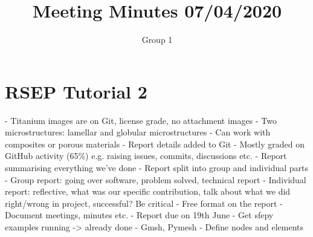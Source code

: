 \documentclass{article}
\title{\bf Meeting Minutes 07/04/2020}
\author{Group 1}
\begin{document}
\maketitle


\section{RSEP Tutorial 2}


- Titanium images are on Git, license grade, no attachment images \newline\newline
- Two microstructures: lamellar and globular microstructures\newline\newline
- Can work with composites or porous materials\newline\newline
- Report details added to Git\newline\newline
- Mostly graded on GitHub activity (65\%) e.g. raising issues, commits, discussions etc.\newline\newline
- Report summarising everything we’ve done\newline\newline
- Report split into group and individual parts\newline\newline
- Group report: going over software, problem solved, technical report\newline\newline
- Individual report: reflective, what was our specific contribution, talk about what we did right/wrong in project, successful? Be critical\newline\newline
- Free format on the report\newline\newline
- Document meetings, minutes etc.\newline\newline
- Report due on 19th June\newline\newline
- Get sfepy examples running -> already done\newline\newline
- Gmsh, Pymesh\newline\newline
- Define nodes and elements\newline\newline
\end{document}
